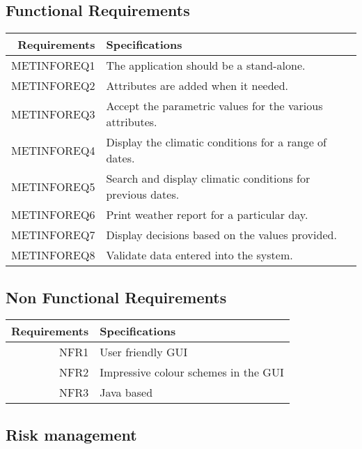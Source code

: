 \documentclass{article}
\begin{document}
\subsection{Functional Requirements}

\begin{center}
\begin{tabular}{|r|l|}

\hline
Requirements & Specifications\\[5pt]
\hline

METINFOREQ1 &
The application should be a stand-alone. 
\\\hline

METINFOREQ2 &
Attributes are added when it needed.
\\\hline

METINFOREQ3&
Accept the parametric values for the various attributes.
\\\hline

METINFOREQ4&
Display the climatic conditions for a range of dates.
\\\hline

METINFOREQ5&
Search and display climatic conditions for previous dates.
\\\hline

METINFOREQ6&
Print weather report for a particular day. 
\\\hline

METINFOREQ7&
Display decisions based on the values provided.
\\\hline

METINFOREQ8&
Validate data entered into the system.
\\\hline
\end{tabular}
\end{center}

\subsection{Non Functional Requirements}

\begin{tabular}{|r|l|}

\hline
Requirements & Specifications\\[5pt]
\hline
NFR1&
User friendly GUI
\\\hline

NFR2&
Impressive colour schemes in the GUI
\\\hline

NFR3&
Java based
\\\hline

\end{tabular}

\subsection{Risk management}
\label{sec:riskman}
\pagebreak





\end{document}
